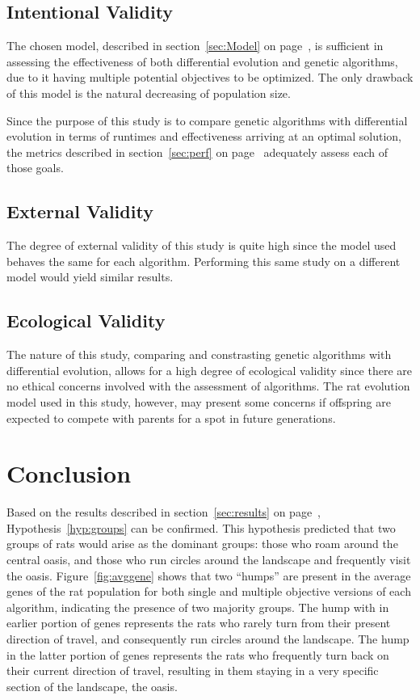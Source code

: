 \documentclass{sig-alternate}
\begin{document}
\subsection{Intentional Validity}
The chosen model, described in section~\ref{sec:Model} on page~\pageref{sec:Model}, is sufficient in assessing the effectiveness of both differential evolution and genetic algorithms, due to it having multiple potential objectives to be optimized.  The only drawback of this model is the natural decreasing of population size.

Since the purpose of this study is to compare genetic algorithms with differential evolution in terms of runtimes and effectiveness arriving at an optimal solution, the metrics described in section~\ref{sec:perf} on page~\pageref{sec:perf} adequately assess each of those goals.
 
\subsection{External Validity}
The degree of external validity of this study is quite high since the model used behaves the same for each algorithm.  Performing this same study on a different model would yield similar results.

\subsection{Ecological Validity}
The nature of this study, comparing and constrasting genetic algorithms with differential evolution, allows for a high degree of ecological validity since there are no ethical concerns involved with the assessment of algorithms.  The rat evolution model used in this study, however, may present some concerns if offspring are expected to compete with parents for a spot in future generations.

\section{Conclusion}

Based on the results described in section~\ref{sec:results} on page~\pageref{sec:results}, Hypothesis~\ref{hyp:groups} can be confirmed.  This hypothesis predicted that two groups of rats would arise as the dominant groups: those who roam around the central oasis, and those who run circles around the landscape and frequently visit the oasis.  Figure~\ref{fig:avggene} shows that two ``humps'' are present in the average genes of the rat population for both single and multiple objective versions of each algorithm, indicating the presence of two majority groups.  The hump with in earlier portion of genes represents the rats who rarely turn from their present direction of travel, and consequently run circles around the landscape.  The hump in the latter portion of genes represents the rats who frequently turn back on their current direction of travel, resulting in them staying in a very specific section of the landscape, the oasis.
\end{document}
